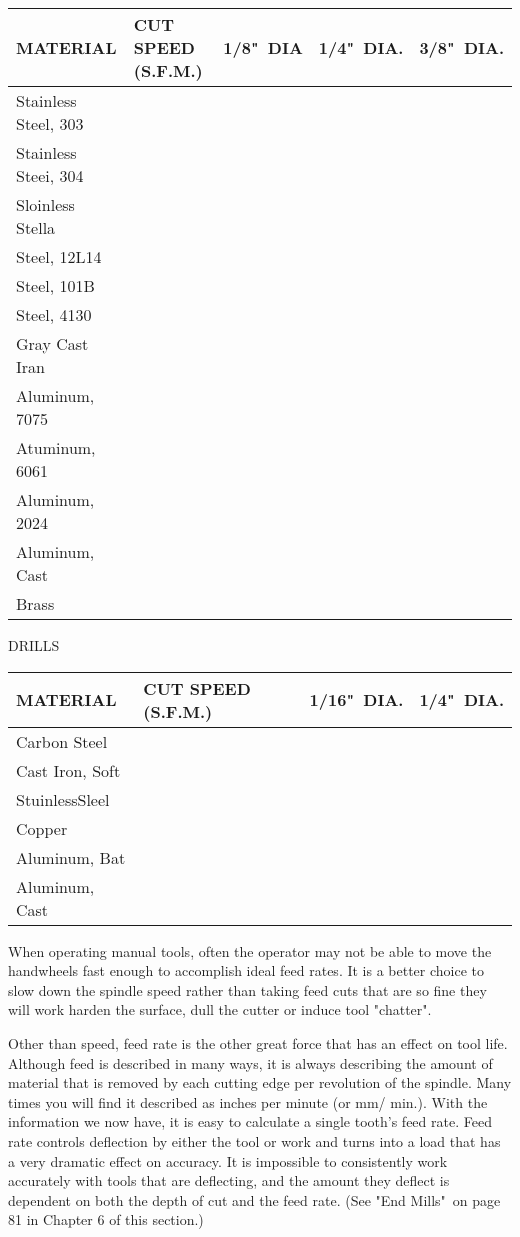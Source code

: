 \begin{tabular}{l l l l l}
\hline
MATERIAL & CUT SPEED (S.F.M.) & 1/8"\ DIA & 1/4"\ DIA. & 3/8"\ DIA. \\
\hline
Stainless Steel, 303\\				
Stainless Steei, 304\\				
Sloinless Stella\\				
Steel, 12L14\\				
Steel, 101B\\				
Steel, 4130\\				
Gray Cast Iran\\				
Aluminum, 7075\\				
Atuminum, 6061\\				
Aluminum, 2024\\				
Aluminum, Cast\\				
Brass\\				
\hline
\end{tabular}

\bigskip
DRILLS
\bigskip

\begin{tabular}{l l l l}
\hline
MATERIAL & CUT SPEED (S.F.M.) & 1/16"\ DIA. & 1/4"\ DIA. \\
\hline
Carbon Steel\\			
Cast Iron, Soft\\			
StuinlessSleel\\			
Copper\\			
Aluminum, Bat\\			
Aluminum, Cast\\			
\hline
\end{tabular}

\bigskip


When operating manual tools, often the operator may not be able to move the
handwheels fast enough to accomplish ideal feed rates. It is a better choice to
slow down the spindle speed rather than taking feed cuts that are so fine they
will work harden the surface, dull the cutter or induce tool "chatter".

Other than speed, feed rate is the other great force that has an effect on tool
life. Although feed is described in many ways, it is always describing the
amount of material that is removed by each cutting edge per revolution of the
spindle. Many times you will find it described as inches per minute (or mm/
min.). With the information we now have, it is easy to calculate a single
tooth's feed rate. Feed rate controls deflection by either the tool or work and
turns into a load that has a very dramatic effect on accuracy. It is impossible
to consistently work accurately with tools that are deflecting, and the amount
they deflect is dependent on both the depth of cut and the feed rate. (See "End
Mills"\ on page 81 in Chapter 6 of this section.)

